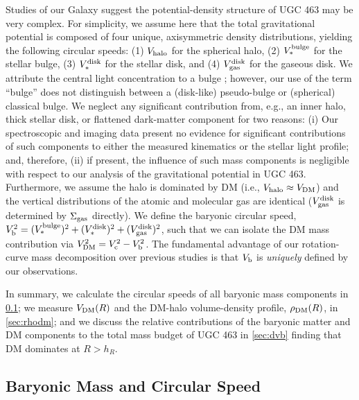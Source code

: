 \documentclass[apj,iop,numberedappendix]{emulateapj}
\begin{document}
Studies of our Galaxy suggest the potential-density structure of UGC 463 may be
very complex.  For simplicity, we assume here that the total gravitational
potential is composed of four unique, axisymmetric density distributions,
yielding the following circular speeds: (1) $V_{\rm halo}$ for the spherical halo, (2)
$V^{\rm bulge}_\ast$ for the stellar bulge, (3) $V^{\rm disk}_\ast$ for the stellar disk, and
(4) $V^{\rm disk}_{\rm gas}$ for the gaseous disk.  We attribute the central light
concentration to a bulge \citep[cf.][who propose such surface density peaks may
be attributed to the disk]{2009MNRAS.396..121D}; however, our use of the term
``bulge'' does not distinguish between a (disk-like) pseudo-bulge
\citep{2004ARA&A..42..603K} or (spherical) classical bulge.  We neglect any
significant contribution from, e.g., an inner halo, thick stellar disk, or
flattened dark-matter component for two reasons: (i) Our spectroscopic and
imaging data present no evidence for significant contributions of such
components to either the measured kinematics or the stellar light profile; and,
therefore, (ii) if present, the influence of such mass components is negligible
with respect to our analysis of the gravitational potential in UGC 463.
Furthermore, we assume the halo is dominated by DM (i.e., $V_{\rm halo} \approx V_{\rm DM}$)
and the vertical distributions of the atomic and molecular gas are identical
($V^{\rm disk}_{\rm gas}$ is determined by $\Sigma_{\rm gas}$ directly).  We define the baryonic circular
speed, $V_{\rm b}^2 = (V^{\rm bulge}_\ast)^2 + (V^{\rm disk}_\ast)^2 + (V^{\rm disk}_{\rm gas})^2$, such that
we can isolate the DM mass contribution via $V_{\rm DM}^2 = V_{\rm c}^2 -V_{\rm b}^2$.  The
fundamental advantage of our rotation-curve mass decomposition over previous
studies is that $V_{\rm b}$ is {\it uniquely} defined by our observations.

In summary, we calculate the circular speeds of all baryonic mass components in
\sect \ref{sec:baryrc}; we measure $V_{\rm DM}(R)$ and the DM-halo volume-density
profile, $\rho_{\rm DM}(R)$, in \sect \ref{sec:rhodm}; and we discuss the relative
contributions of the baryonic matter and DM components to the total mass budget
of UGC 463 in \sect \ref{sec:dvb} finding that DM dominates at $R>h_R$.

\subsection{Baryonic Mass and Circular Speed}
\label{sec:baryrc}
\end{document}

